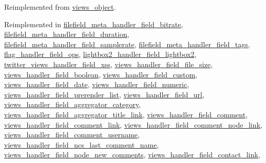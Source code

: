 Reimplemented from \hyperlink{classviews__object_b0753d0001c8c9ff98beee696b4516ba}{views\_\-object}.

Reimplemented in \hyperlink{classfilefield__meta__handler__field__bitrate_678b8ef891e4b4024d22e2b914e20b15}{filefield\_\-meta\_\-handler\_\-field\_\-bitrate}, \hyperlink{classfilefield__meta__handler__field__duration_3bf4ecb0dbaa680516e6e27306771dd4}{filefield\_\-meta\_\-handler\_\-field\_\-duration}, \hyperlink{classfilefield__meta__handler__field__samplerate_007d94cba3f5de5e8e0c78e8b3b1ef5a}{filefield\_\-meta\_\-handler\_\-field\_\-samplerate}, \hyperlink{classfilefield__meta__handler__field__tags_9e809bb733cce1fcd37a59a251c70014}{filefield\_\-meta\_\-handler\_\-field\_\-tags}, \hyperlink{classflag__handler__field__ops_05750d85d477c51b5fa267a75e245d5a}{flag\_\-handler\_\-field\_\-ops}, \hyperlink{classlightbox2__handler__field__lightbox2_641e7b72ac54a1c6baf7fd2bd6424438}{lightbox2\_\-handler\_\-field\_\-lightbox2}, \hyperlink{classtwitter__views__handler__field__xss_b4f2a99eda9640650d83f2b485e9a753}{twitter\_\-views\_\-handler\_\-field\_\-xss}, \hyperlink{classviews__handler__field__file__size_d89ade5ab0f9d3db4fe71df7588c0f34}{views\_\-handler\_\-field\_\-file\_\-size}, \hyperlink{classviews__handler__field__boolean_53f8c9215cddcfb3cab33f742a1e6c52}{views\_\-handler\_\-field\_\-boolean}, \hyperlink{classviews__handler__field__custom_4089ad30293453649f51d4a68005bea1}{views\_\-handler\_\-field\_\-custom}, \hyperlink{classviews__handler__field__date_c2c907d5403ef2085b21619293d701c4}{views\_\-handler\_\-field\_\-date}, \hyperlink{classviews__handler__field__numeric_ab74a55c8b3c564ee995e210a503947b}{views\_\-handler\_\-field\_\-numeric}, \hyperlink{classviews__handler__field__prerender__list_3787d1e3974a37c72f71c062eee52b3d}{views\_\-handler\_\-field\_\-prerender\_\-list}, \hyperlink{classviews__handler__field__url_0b9b0b58eb2fbe175927c6e16d9142f9}{views\_\-handler\_\-field\_\-url}, \hyperlink{classviews__handler__field__aggregator__category_ff9a96fdcd4350cbe9323a9801996016}{views\_\-handler\_\-field\_\-aggregator\_\-category}, \hyperlink{classviews__handler__field__aggregator__title__link_92ccca19cd954e8522c77dd75119d42a}{views\_\-handler\_\-field\_\-aggregator\_\-title\_\-link}, \hyperlink{classviews__handler__field__comment_73136303aae33442ce2ea156c1262b22}{views\_\-handler\_\-field\_\-comment}, \hyperlink{classviews__handler__field__comment__link_9f066947db597494928b57423b1b7d30}{views\_\-handler\_\-field\_\-comment\_\-link}, \hyperlink{classviews__handler__field__comment__node__link_b4da7290cf0b97776fcc70c4f799e567}{views\_\-handler\_\-field\_\-comment\_\-node\_\-link}, \hyperlink{classviews__handler__field__comment__username_6a9ac27498f1ddce0a8d680d6d33b7c5}{views\_\-handler\_\-field\_\-comment\_\-username}, \hyperlink{classviews__handler__field__ncs__last__comment__name_ef3ee7ac3c57f689148d8909e0a3a3df}{views\_\-handler\_\-field\_\-ncs\_\-last\_\-comment\_\-name}, \hyperlink{classviews__handler__field__node__new__comments_eea2f5790d310ddcaba82c05593e82e7}{views\_\-handler\_\-field\_\-node\_\-new\_\-comments}, \hyperlink{classviews__handler__field__contact__link_33c1b1091d417e0e5a1b82bfdc81b83b}{views\_\-handler\_\-field\_\-contact\_\-link}, 